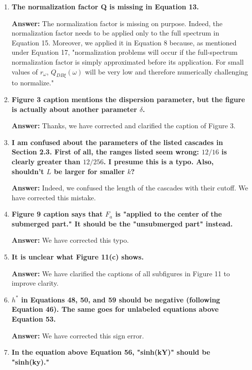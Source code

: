\documentclass{article}
\newcommand{\answer}[1]{\textbf{\textcolor{answercolor}{Answer:}} \textcolor{answercolor}{#1}}
\begin{document}
\begin{enumerate}[label=\textbf{\arabic*.}]
    \item \textbf{The normalization factor Q is missing in Equation 13.}
    
    \answer{The normalization factor is missing on purpose. Indeed, the normalization factor needs to be applied only to the full spectrum in Equation 15. Moreover, we applied it in Equation 8 because, as mentioned under Equation 17, "normalization problems will occur if the full-spectrum normalization factor is simply approximated before its application. For small values of $r_{\omega}$, $Q_{DB\xi}(\omega)$ will be very low and therefore numerically challenging to normalize."}

    \item \textbf{Figure 3 caption mentions the dispersion parameter, but the figure is actually about another parameter $\delta$.}
    
    \answer{Thanks, we have corrected and clarified the caption of Figure 3.}

    \item \textbf{I am confused about the parameters of the listed cascades in Section 2.3. First of all, the ranges listed seem wrong: $12/16$ is clearly greater than $12/256$. I presume this is a typo. Also, shouldn't $L$ be larger for smaller $k$?}
    
    \answer{Indeed, we confused the length of the cascades with their cutoff. We have corrected this mistake.}

    \item \textbf{Figure 9 caption says that $F_a$ is "applied to the center of the submerged part." It should be the "unsubmerged part" instead.}
    
    \answer{We have corrected this typo.}

    \item \textbf{It is unclear what Figure 11(c) shows.}
    
    \answer{We have clarified the captions of all subfigures in Figure 11 to improve clarity.}

    \item \textbf{$h^*$ in Equations 48, 50, and 59 should be negative (following Equation 46). The same goes for unlabeled equations above Equation 53.}
    
    \answer{We have corrected this sign error.}

    \item \textbf{In the equation above Equation 56, "sinh(kY)" should be "sinh(ky)."}
    

\end{enumerate}
\end{document}
